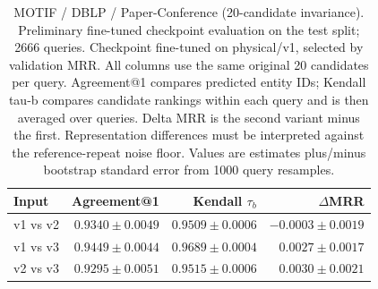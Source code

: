 \begin{table}[t]
\centering
\small
\begin{tabular}{lrrr}
\toprule
Input & Agreement@1 & Kendall $\tau_b$ & $\Delta$MRR \\
\midrule
v1 vs v2 & $0.9340 \pm 0.0049$ & $0.9509 \pm 0.0006$ & $-0.0003 \pm 0.0019$ \\
v1 vs v3 & $0.9449 \pm 0.0044$ & $0.9689 \pm 0.0004$ & $0.0027 \pm 0.0017$ \\
v2 vs v3 & $0.9295 \pm 0.0051$ & $0.9515 \pm 0.0006$ & $0.0030 \pm 0.0021$ \\
\bottomrule
\end{tabular}
\caption{MOTIF / DBLP / Paper-Conference (20-candidate invariance). Preliminary fine-tuned checkpoint evaluation on the test split; 2666 queries. Checkpoint fine-tuned on physical/v1, selected by validation MRR. All columns use the same original 20 candidates per query. Agreement@1 compares predicted entity IDs; Kendall tau-b compares candidate rankings within each query and is then averaged over queries. Delta MRR is the second variant minus the first. Representation differences must be interpreted against the reference-repeat noise floor. Values are estimates plus/minus bootstrap standard error from 1000 query resamples.}
\label{tab:motif-paper_conference-invariance}
\end{table}
